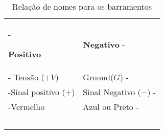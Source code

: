 \documentclass{article}
\newcommand{\topline}{ %
        \arrayrulecolor{rulecolor}\specialrule{0.1em}{\abovetopsep}{0pt}%
        \arrayrulecolor{tableheadcolor}\specialrule{\belowrulesep}{0pt}{0pt}%
        \arrayrulecolor{rulecolor}}
\newcommand{\midtopline}{ %
        \arrayrulecolor{tableheadcolor}\specialrule{\aboverulesep}{0pt}{0pt}%
        \arrayrulecolor{rulecolor}\specialrule{\lightrulewidth}{0pt}{0pt}%
        \arrayrulecolor{white}\specialrule{\belowrulesep}{0pt}{0pt}%
        \arrayrulecolor{rulecolor}}
\newcommand{\bottomline}{ %
        \arrayrulecolor{white}\specialrule{\aboverulesep}{0pt}{0pt}%
        \arrayrulecolor{rulecolor} %
        \specialrule{\heavyrulewidth}{0pt}{\belowbottomsep}}%
\begin{document}
\begin{table}[h]
\centering
\caption{Relação de nomes para os barramentos \label{tab:relacao_nomes_barramentos} }
\begin{tabular}{>{\kern-\tabcolsep}ll<{\kern-\tabcolsep}}
\topline\rowcolor{tableheadcolor}

\textbf{Positivo}    &  \textbf{Negativo} \\  \midtopline
Tensão ($+V$)          & Ground($G$)            \\
Sinal positivo ($+$) & Sinal Negativo ($-$) \\
Vermelho             & Azul ou Preto        \\ \bottomline
\end{tabular}
\end{table}
\end{document}
